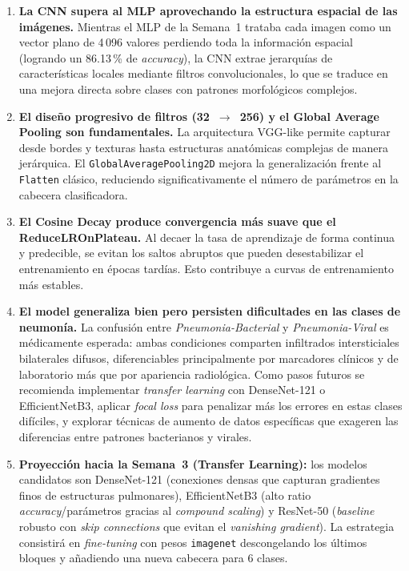 \documentclass[10pt,twocolumn]{article}
\begin{document}
\begin{enumerate}[leftmargin=*,noitemsep,topsep=2pt]

\item \textbf{La CNN supera al MLP aprovechando la estructura espacial
de las imágenes.}  Mientras el MLP de la Semana~1 trataba cada imagen
como un vector plano de 4\,096 valores perdiendo toda la información
espacial (logrando un 86.13\,\% de \textit{accuracy}), la CNN extrae
jerarquías de características locales mediante filtros convolucionales,
lo que se traduce en una mejora directa sobre clases con patrones
morfológicos complejos.

\item \textbf{El diseño progresivo de filtros (32~$\to$~256) y el
Global Average Pooling son fundamentales.}  La arquitectura VGG-like
permite capturar desde bordes y texturas hasta estructuras anatómicas
complejas de manera jerárquica.  El \texttt{GlobalAveragePooling2D}
mejora la generalización frente al \texttt{Flatten} clásico, reduciendo
significativamente el número de parámetros en la cabecera clasificadora.

\item \textbf{El Cosine Decay produce convergencia más suave que el
ReduceLROnPlateau.}  Al decaer la tasa de aprendizaje de forma continua
y predecible, se evitan los saltos abruptos que pueden desestabilizar
el entrenamiento en épocas tardías.  Esto contribuye a curvas de
entrenamiento más estables.

\item \textbf{El model generaliza bien pero persisten dificultades en
las clases de neumonía.}  La confusión entre
\textit{Pneumonia-Bacterial} y \textit{Pneumonia-Viral} es médicamente
esperada: ambas condiciones comparten infiltrados intersticiales
bilaterales difusos, diferenciables principalmente por marcadores
clínicos y de laboratorio más que por apariencia radiológica.  Como
pasos futuros se recomienda implementar \textit{transfer learning} con
DenseNet-121 o EfficientNetB3, aplicar \textit{focal loss} para penalizar 
más los errores en estas clases difíciles, y explorar técnicas de aumento 
de datos específicas que exageren las diferencias entre patrones 
bacterianos y virales.

\item \textbf{Proyección hacia la Semana~3 (Transfer Learning):}
los modelos candidatos son DenseNet-121 (conexiones densas que capturan
gradientes finos de estructuras pulmonares), EfficientNetB3 (alto ratio
\textit{accuracy}/parámetros gracias al \textit{compound scaling}) y
ResNet-50 (\textit{baseline} robusto con \textit{skip connections} que
evitan el \textit{vanishing gradient}).  La estrategia consistirá en
\textit{fine-tuning} con pesos \texttt{imagenet} descongelando los
últimos bloques y añadiendo una nueva cabecera para 6 clases.

\end{enumerate}
\end{document}
